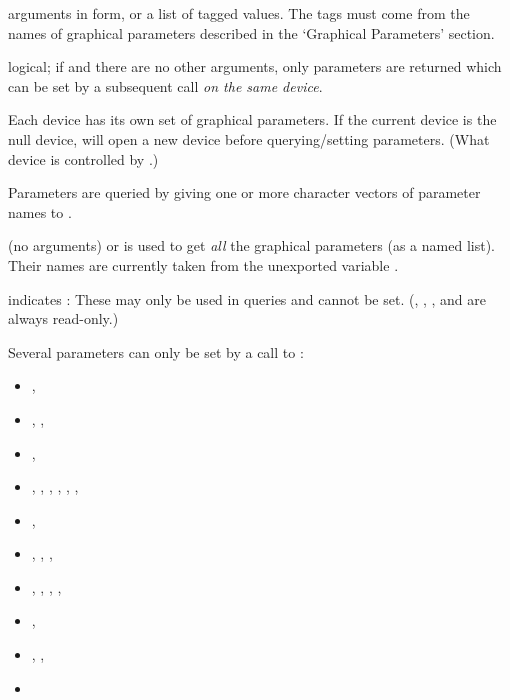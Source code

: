 %
\begin{Arguments}
\begin{ldescription}
\item[\code{...}] arguments in  form, or a list of tagged
values.  The tags must come from the names of graphical parameters
described in the `Graphical Parameters' section.
\item[\code{no.readonly}] logical; if  and there are no other
arguments, only parameters are returned which can be set by a
subsequent  call \emph{on the same device}.
\end{ldescription}
\end{Arguments}
%
\begin{Details}\relax
Each device has its own set of graphical parameters.  If the current
device is the null device,  will open a new device before
querying/setting parameters.  (What device is controlled by
.)

Parameters are queried by giving one or more character vectors of
parameter names to .

 (no arguments) or  is used to
get \emph{all} the graphical parameters (as a named list).  Their
names are currently taken from the unexported variable
.

\emph{} indicates \emph{}: These
may only be used in queries and cannot be set.  (,
, ,  and  are always
read-only.)

Several parameters can only be set by a call to :
\begin{itemize}

\item {},
\item {}, ,
\item {},
\item {}, , ,
, , ,
\item {},
\item {}, , ,
\item {}, , , ,
\item {},
\item {}, ,
\item {}


\end{itemize}
\end{Details}
